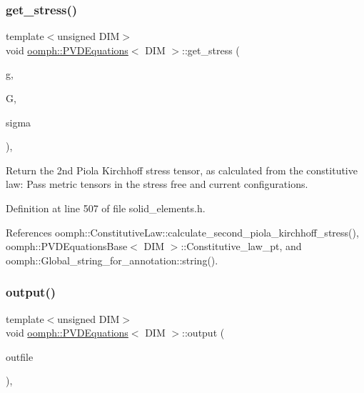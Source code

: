 \subsubsection{\texorpdfstring{get\+\_\+stress()}{get\_stress()}\hspace{0.1cm}{\footnotesize\ttfamily [2/2]}}
{\footnotesize\ttfamily template$<$unsigned D\+IM$>$ \\
void \hyperlink{classoomph_1_1PVDEquations}{oomph\+::\+P\+V\+D\+Equations}$<$ D\+IM $>$\+::get\+\_\+stress (\begin{DoxyParamCaption}\item[{const \hyperlink{classoomph_1_1DenseMatrix}{Dense\+Matrix}$<$ double $>$ \&}]{g,  }\item[{const \hyperlink{classoomph_1_1DenseMatrix}{Dense\+Matrix}$<$ double $>$ \&}]{G,  }\item[{\hyperlink{classoomph_1_1DenseMatrix}{Dense\+Matrix}$<$ double $>$ \&}]{sigma }\end{DoxyParamCaption})\hspace{0.3cm}{\ttfamily [inline]}, {\ttfamily [protected]}}



Return the 2nd Piola Kirchhoff stress tensor, as calculated from the constitutive law\+: Pass metric tensors in the stress free and current configurations. 



Definition at line 507 of file solid\+\_\+elements.\+h.



References oomph\+::\+Constitutive\+Law\+::calculate\+\_\+second\+\_\+piola\+\_\+kirchhoff\+\_\+stress(), oomph\+::\+P\+V\+D\+Equations\+Base$<$ D\+I\+M $>$\+::\+Constitutive\+\_\+law\+\_\+pt, and oomph\+::\+Global\+\_\+string\+\_\+for\+\_\+annotation\+::string().

\mbox{\label{classoomph_1_1PVDEquations_ab9e919921934cfe7433420bd2e4482f5}} 
\subsubsection{\texorpdfstring{output()}{output()}\hspace{0.1cm}{\footnotesize\ttfamily [1/4]}}
{\footnotesize\ttfamily template$<$unsigned D\+IM$>$ \\
void \hyperlink{classoomph_1_1PVDEquations}{oomph\+::\+P\+V\+D\+Equations}$<$ D\+IM $>$\+::output (\begin{DoxyParamCaption}\item[{std\+::ostream \&}]{outfile }\end{DoxyParamCaption})\hspace{0.3cm}{\ttfamily [inline]}, {\ttfamily [virtual]}}



